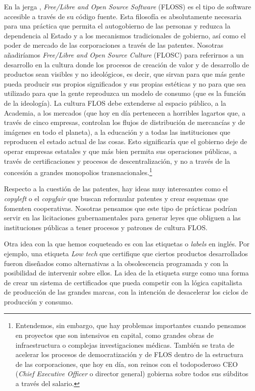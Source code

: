 En la jerga , \emph{Free/Libre and Open Source Software} (FLOSS) es el tipo de software accesible a través de su código fuente. Esta filosofía es absolutamente necesaria para una práctica que permita el autogobierno de las personas y reduzca la dependencia al Estado y a los mecanismos tradicionales de gobierno, así como el poder de mercado de las corporaciones a través de las patentes. Nosotras añadiríamos \emph{Free/Libre and Open Source Culture} (FLOSC) para referirnos a un desarrollo en la cultura donde los procesos de creación de valor y de desarrollo de productos sean visibles y no ideológicos, es decir, que sirvan para que más gente pueda producir sus propios significados y sus propias estéticas y no para que sea utilizado para que la gente reproduzca un modelo de consumo (que es la función de la ideología). La cultura FLOS debe extenderse al espacio público, a la Academia, a los mercados (que hoy en día pertenecen a horribles lagartos que, a través de cinco empresas, controlan los flujos de distribución de mercancías y de imágenes en todo el planeta), a la educación y a todas las instituciones que reproducen el estado actual de las cosas. Esto significaría que el gobierno deje de operar empresas estatales y que más bien permita sus operaciones públicas, a través de certificaciones y procesos de descentralización, y no a través de la concesión a grandes monopolios transnacionales.\footnote{Entendemos, sin embargo, que hay problemas importantes cuando pensamos en proyectos que son intensivos en capital, como grandes obras de infraestructura o complejas investigaciones médicas. También se trata de acelerar los procesos de democratización y de FLOS dentro de la estructura de las corporaciones, que hoy en día, son reinos con el todopoderoso CEO (\emph{Chief Executive Officer} o director general) gobierna sobre todos sus súbditos a través del salario.}

Respecto a la cuestión de las patentes, hay ideas muy interesantes como el \emph{copyleft} o el \emph{copyfair} que buscan reformular patentes y crear esquemas que fomenten cooperativas. Nosotras pensamos que este tipo de prácticas podrían servir en las licitaciones gubernamentales para generar leyes que obliguen a las instituciones públicas a tener procesos y patrones de cultura FLOS.

Otra idea con la que hemos coqueteado es con las etiquetas o \emph{labels} en inglés. Por ejemplo, una etiqueta \emph{Low tech} que certifique que ciertos productos desarrollados fueron diseñados como alternativas a la obsolescencia programada y con la posibilidad de intervenir sobre ellos. La idea de la etiqueta surge como una forma de crear un sistema de certificados que pueda competir con la lógica capitalista de producción de las grandes marcas, con la intención de desacelerar los ciclos de producción y consumo.

